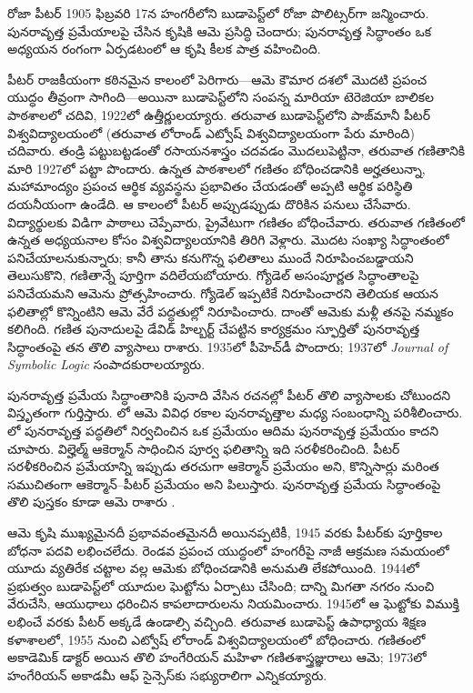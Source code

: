 \documentclass[../../../include/open-logic-section]{subfiles}
\begin{document}


 
రోజా పీటర్ 1905 ఫిబ్రవరి 17న హంగరీలోని బుడాపెస్ట్‌లో రోజా పొలిట్సర్‌గా జన్మించారు. పునరావృత్త ప్రమేయాలపై చేసిన కృషికి ఆమె ప్రసిద్ధి చెందారు; పునరావృత్త సిద్ధాంతం ఒక అధ్యయన రంగంగా ఏర్పడటంలో ఆ కృషి కీలక పాత్ర వహించింది.

పీటర్ రాజకీయంగా కఠినమైన కాలంలో పెరిగారు---ఆమె కౌమార దశలో మొదటి ప్రపంచ యుద్ధం తీవ్రంగా సాగింది---అయినా బుడాపెస్ట్‌లోని సంపన్న మారియా టెరెజియా బాలికల పాఠశాలలో చదివి, 1922లో ఉత్తీర్ణులయ్యారు. తరువాత బుడాపెస్ట్‌లోని పాజ్‌మానీ పీటర్ విశ్వవిద్యాలయంలో (తరువాత లోరాండ్ ఎట్వోష్ విశ్వవిద్యాలయంగా పేరు మారింది) చదివారు. తండ్రి పట్టుబట్టడంతో రసాయనశాస్త్రం చదవడం మొదలుపెట్టినా, తరువాత గణితానికి మారి 1927లో పట్టా పొందారు. ఉన్నత పాఠశాలలో గణితం బోధించడానికి అర్హతలున్నా, మహామాంద్యం ప్రపంచ ఆర్థిక వ్యవస్థను ప్రభావితం చేయడంతో అప్పటి ఆర్థిక పరిస్థితి దయనీయంగా ఉండేది. ఆ కాలంలో పీటర్ అప్పుడప్పుడు దొరికిన పనులు చేసేవారు. విద్యార్థులకు విడిగా పాఠాలు చెప్పేవారు, ప్రైవేటుగా గణితం బోధించేవారు. తరువాత గణితంలో ఉన్నత అధ్యయనాల కోసం విశ్వవిద్యాలయానికి తిరిగి వెళ్లారు. మొదట సంఖ్యా సిద్ధాంతంలో పనిచేయాలనుకున్నారు; కానీ తాను కనుగొన్న ఫలితాలు ముందే నిరూపించబడ్డాయని తెలుసుకొని, గణితాన్నే పూర్తిగా వదిలేయబోయారు. గ్యోడెల్ అసంపూర్ణత సిద్ధాంతాలపై పనిచేయమని ఆమెను ప్రోత్సహించారు. గ్యోడెల్ ఇప్పటికే నిరూపించారని తెలియక ఆయన ఫలితాల్లో కొన్నింటిని ఆమె వేరే పద్ధతుల్లో నిరూపించారు. దాంతో ఆమెకు మళ్లీ తనపై నమ్మకం కలిగింది. గణిత పునాదులపై డేవిడ్ హిల్బర్ట్ చేపట్టిన కార్యక్రమం స్ఫూర్తితో పునరావృత్త సిద్ధాంతంపై తన తొలి వ్యాసాలు రాశారు. 1935లో పీహెచ్‌డీ పొందారు; 1937లో \emph{Journal of
  Symbolic Logic} సంపాదకురాలయ్యారు.

పునరావృత్త ప్రమేయ సిద్ధాంతానికి పునాది వేసిన రచనల్లో పీటర్ తొలి వ్యాసాలకు చోటుందని విస్తృతంగా గుర్తిస్తారు. \cite{Peter1935a}లో ఆమె వివిధ రకాల పునరావృత్తాల మధ్య సంబంధాన్ని పరిశీలించారు. \cite{Peter1935b}లో పునరావృత్త పద్ధతిలో నిర్వచించిన ఒక ప్రమేయం ఆదిమ పునరావృత్త ప్రమేయం కాదని చూపారు. విల్హెల్మ్ ఆకెర్మాన్ సాధించిన పూర్వ ఫలితాన్ని ఇది సరళీకరించింది. పీటర్ సరళీకరించిన ప్రమేయాన్ని ఇప్పుడు తరచుగా ఆకెర్మాన్ ప్రమేయం అని, కొన్నిసార్లు మరింత సముచితంగా ఆకెర్మాన్--పీటర్ ప్రమేయం అని పిలుస్తారు. పునరావృత్త ప్రమేయ సిద్ధాంతంపై తొలి పుస్తకం కూడా ఆమె రాశారు \citep{Peter1951}.

ఆమె కృషి ముఖ్యమైనదీ ప్రభావవంతమైనదీ అయినప్పటికీ, 1945 వరకు పీటర్‌కు పూర్తికాల బోధనా పదవి లభించలేదు. రెండవ ప్రపంచ యుద్ధంలో హంగరీపై నాజీ ఆక్రమణ సమయంలో యూదు వ్యతిరేక చట్టాల వల్ల ఆమెకు బోధించడానికి అనుమతి లేకపోయింది. 1944లో ప్రభుత్వం బుడాపెస్ట్‌లో యూదుల ఘెట్టోను ఏర్పాటు చేసింది; దాన్ని మిగతా నగరం నుంచి వేరుచేసి, ఆయుధాలు ధరించిన కాపలాదారులను నియమించారు. 1945లో ఆ ఘెట్టోకు విముక్తి లభించే వరకు పీటర్ అక్కడే ఉండాల్సి వచ్చింది. తరువాత బుడాపెస్ట్ ఉపాధ్యాయ శిక్షణ కళాశాలలో, 1955 నుంచి ఎట్వోష్ లోరాండ్ విశ్వవిద్యాలయంలో బోధించారు. గణితంలో అకాడెమిక్ డాక్టర్ అయిన తొలి హంగేరియన్ మహిళా గణితశాస్త్రజ్ఞురాలు ఆమె; 1973లో హంగేరియన్ అకాడమీ ఆఫ్ సైన్సెస్‌కు సభ్యురాలిగా ఎన్నికయ్యారు.
\end{document}
